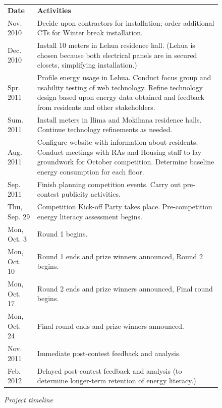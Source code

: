 \documentclass[11pt]{article}
\begin{document}
\begin{figure}[!ht]
\small
\begin{tabular}{p{1in}p{5in}} \hline
{\bf Date} & {\bf Activities}  \\
Nov. 2010 &  Decide upon contractors for installation; order additional CTs for Winter break installation. \\

Dec. 2010 & Install 10 meters in Lehua residence hall.  (Lehua is chosen because both electrical panels are in secured closets, simplifying installation.) \\

Spr. 2011 &  Profile energy usage in Lehua. Conduct focus group and usability testing of web technology.  Refine technology design based upon energy data obtained and feedback from residents and other stakeholders.  \\

Sum. 2011 & Install meters in Ilima and Mokihana residence halls.  Continue technology refinements as needed. \\

Aug. 2011  & Configure website with information about residents.  Conduct meetings with RAs and Housing staff to lay groundwork for October competition. Determine baseline energy consumption for each floor.\\

Sep. 2011 & Finish planning competition events.  Carry out pre-contest publicity activities.   \\

Thu, Sep. 29 & Competition Kick-off Party takes place.  Pre-competition energy literacy assessment begins. \\

Mon, Oct. 3 & Round 1 begins. \\

Mon, Oct. 10 & Round 1 ends and prize winners announced, Round 2 begins. \\

Mon, Oct. 17 & Round 2 ends and prize winners announced, Final round begins. \\

Mon, Oct. 24 & Final round ends and prize winners announced.  \\

Nov. 2011 &  Immediate post-contest feedback and analysis.  \\

Feb. 2012 &  Delayed post-contest feedback and analysis (to determine longer-term retention of energy literacy.)  \\ \hline
\end{tabular} 
\normalsize
\caption{{\em Project timeline}}
\label{fig:timeline}
\end{figure}
\end{document}
